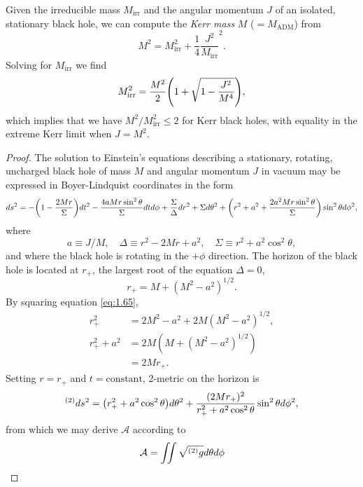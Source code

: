Given the irreducible mass $M_\mathrm{irr}$ and the angular momentum $J$ of an isolated, stationary black hole, we can compute the \textit{Kerr mass} $M$ ($=M_\mathrm{ADM}$) from
\begin{equation}
	M^2 = M_\mathrm{irr}^2 + \frac{1}{4}\frac{J^2}{M_\mathrm{irr}}^2.
\end{equation}
Solving for $M_\mathrm{irr}$ we find
\begin{equation}
	M_\mathrm{irr}^2 = \frac{M^2}{2}\qty(1 + \sqrt{1 - \frac{J^2}{M^4}}),
\end{equation}
which implies that we have $M^2 / M_\mathrm{irr}^2 \le 2$ for Kerr black holes, with equality in the extreme Kerr limit when $J = M^2$.
\begin{proof}
The solution to Einstein's equations describing a stationary, rotating, uncharged black hole of mass $M$ and angular momentum $J$ in vacuum may be expressed in Boyer-Lindquist coordinates in the form
\begin{equation}
	ds^2 = - \qty(1 - \frac{2Mr}{\Sigma})dt^2 - \frac{4aMr\sin^2 \theta}{\Sigma}dtd\phi + \frac{\Sigma}{\Delta}dr^2 + \Sigma d\theta^2 + \qty(r^2 + a^2 + \frac{2a^2Mr\sin^2\theta}{\Sigma})\sin^2\theta d\phi^2,
\end{equation}
where
\begin{equation}
	a\equiv J / M, \quad \Delta \equiv r^2 - 2Mr + a^2, \quad \Sigma \equiv r^2 + a^2 \cos^2 \theta,
\end{equation}
and where the black hole is rotating in the $+\phi$ direction. The horizon of the black hole is located at $r_+$, the largest root of the equation $\Delta = 0$,
\begin{equation}
	r_+ = M + (M^2 - a^2)^{1/2}. \label{eq:1.65}
\end{equation}
By squaring equation \eqref{eq:1.65},
\begin{align}
	r_+^2 &= 2M^2 - a^2 + 2M(M^2 - a^2)^{1/2},\\
	r_+^2 + a^2 &= 2M(M + (M^2 - a^2)^{1/2})\\
	&= 2Mr_+.
\end{align}
Setting $r=r_+$ and $t=\mathrm{constant}$, 2-metric on the horizon is
\begin{equation}
	{}^{(2)} ds^2 = \qty(r_+^2 + a^2\cos^2\theta)d\theta^2 + \frac{(2Mr_+)^2}{r_+^2+a^2\cos^2\theta}\sin^2\theta d\phi^2,
\end{equation}
from which we may derive $\mathcal{A}$ according to
\begin{align}
\mathcal{A} &= \iint \sqrt{\dmtwo g}d\theta d\phi\\

\end{align}
\end{proof}

